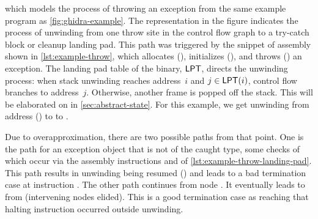 which models the process of throwing an exception from the same example program as \cref{fig:ghidra-example}.
The representation in the figure indicates the process of unwinding from one throw site in the control flow graph to a try-catch block or cleanup landing pad.
This path was triggered by the snippet of assembly shown in \cref{lst:example-throw}, which allocates (), initializes (), and throws () an exception.
The landing pad table of the binary, $\operatorname{\mathsf{LPT}}$, directs the unwinding process:
when stack unwinding reaches address~$i$ and $j\in\operatorname{\mathsf{LPT}}(i)$,
control flow branches to address~$j$.
Otherwise, another frame is popped off the stack.
This will be elaborated on in
\cref{sec:abstract-state}.
For this example, we get unwinding from address () to
to .

Due to overapproximation, there are two possible paths from that point.
One is the path for an exception object that is not of the caught type,
some checks of which occur via the assembly instructions  and  of \cref{lst:example-throw-landing-pad}.
This path results in unwinding being resumed () and leads to a bad termination case at instruction .
The other path continues from node .
It eventually leads to  from  (intervening nodes elided).
This is a good termination case as reaching that halting instruction occurred outside unwinding.

